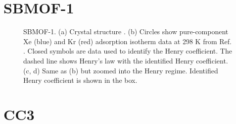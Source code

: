 
    \section{SBMOF-1}
    
    \begin{figure}[h!]
       \centering
  
       
       \caption{SBMOF-1. (a) Crystal structure \cite{SBMOF-1_structure}.
       (b) Circles show pure-component Xe (blue) and Kr (red) adsorption isotherm data at 298 K from Ref. \cite{SBMOF-1_XeKr}. 
       Closed symbols are data used to identify the Henry coefficient. The dashed line shows Henry's law with the identified Henry coefficient.
       (c, d) Same as (b) but zoomed into the Henry regime. Identified Henry coefficient is shown in the box.}
    \end{figure}
    
    \clearpage
    
    
    \section{CC3}
    
